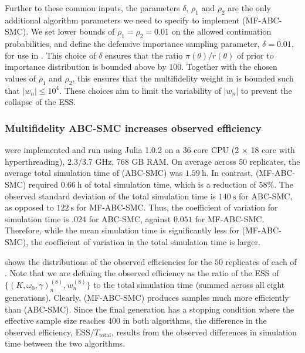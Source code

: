 \documentclass[review]{siamonline190516}
\begin{document}
Further to these common inputs, the parameters $\delta$, $\rho_1$ and $\rho_2$ are the only additional algorithm parameters we need to specify to implement  (MF-ABC-SMC).
We set lower bounds of $\rho_1 = \rho_2 = 0.01$ on the allowed continuation probabilities, and define the defensive importance sampling parameter, $\delta = 0.01$, for use in .
This choice of $\delta$ ensures that the ratio $\pi(\theta)/r(\theta)$ of prior to importance distribution is bounded above by $100$.
Together with the chosen values of $\rho_1$ and $\rho_2$, this ensures that the multifidelity weight in  is bounded such that $|w_n| \leq 10^4$.
These choices aim to limit the variability of $|w_n|$ to prevent the collapse of the ESS.

\subsubsection{Multifidelity ABC-SMC increases observed efficiency}
\label{s:Results:Efficiency}

 were implemented and run using Julia 1.0.2 on a 36 core CPU (2 $\times$ 18 core with hyperthreading), 2.3/3.7 GHz, 768 GB RAM.
On average across $50$ replicates, the average total simulation time of  (ABC-SMC) was $1.59~\mathrm{h}$. 
In contrast,  (MF-ABC-SMC) required $0.66~\mathrm{h}$ of total simulation time, which is a reduction of $58\%$.
The observed standard deviation of the total simulation time is $140~\mathrm{s}$ for ABC-SMC, as opposed to $122~\mathrm{s}$ for MF-ABC-SMC.
Thus, the coefficient of variation for simulation time is $.024$ for ABC-SMC, against $0.051$ for MF-ABC-SMC.
Therefore, while the mean simulation time is significantly less for  (MF-ABC-SMC), the coefficient of variation in the total simulation time is larger.

 shows the distributions of the observed efficiencies for the $50$ replicates of each of .
Note that we are defining the observed efficiency as the ratio of the ESS of $\{(K, \omega_0, \gamma)_n^{(8)},  w_n^{(8)} \}$ to the total simulation time (summed across all eight generations).
Clearly,  (MF-ABC-SMC) produces samples much more efficiently than  (ABC-SMC).
Since the final generation has a stopping condition where the effective sample size reaches $400$ in both algorithms, the difference in the observed efficiency, $\mathrm{ESS}/T_{\mathrm{total}}$, results from the observed differences in simulation time between the two algorithms.
\end{document}
